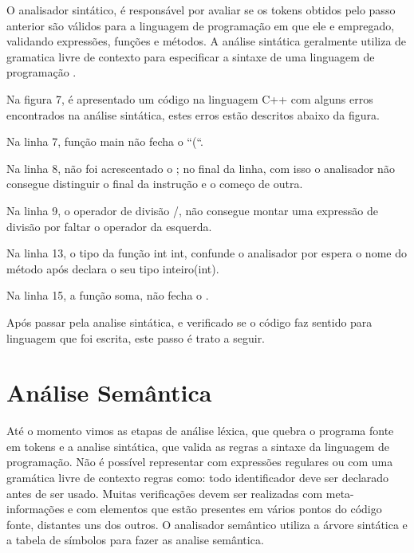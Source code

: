 \documentclass[12pt,oneside,a4paper,chapter=TITLE,section=TITLE,sumario=tradicional]{abntex2}
\begin{document}
O analisador sintático, é responsável por avaliar se os tokens obtidos pelo passo anterior são válidos para a linguagem de programação em que ele e empregado, validando expressões, funções e métodos. A análise sintática geralmente utiliza de gramatica livre de contexto para especificar a sintaxe de uma linguagem de programação \cite{maragon2015}.

Na figura 7, é apresentado um código na linguagem C++ com alguns erros encontrados na análise sintática, estes erros estão descritos abaixo da figura.

\begin{lista}
	\item Na linha 7, função main não fecha o “(“.
	\item Na linha 8, não foi acrescentado o ; no final da linha, com isso o analisador não consegue distinguir o final da instrução e o começo de outra.
	\item Na linha 9, o operador de divisão /, não consegue montar uma expressão de divisão por faltar o operador da esquerda. 
	\item Na linha 13, o tipo da função int int, confunde o analisador por espera o nome do método após declara o seu tipo inteiro(int).
	\item Na linha 15, a função soma, não fecha o .
\end{lista}

\begin{figure}[htb]
\end{figure}

Após passar pela analise sintática, e verificado se o código faz sentido para linguagem que foi escrita, este passo é trato a seguir.

\section{Análise Semântica}
\label{sec:analise-semantica}

Até o momento vimos as etapas de análise léxica, que quebra o programa fonte em tokens e a analise sintática, que valida as regras a sintaxe da linguagem de programação. Não é possível representar com expressões regulares ou com uma gramática livre de contexto regras como: todo identificador deve ser declarado antes de ser usado. Muitas verificações devem ser realizadas com meta-informações e com elementos que estão presentes em vários pontos do código fonte, distantes uns dos outros. O analisador semântico utiliza a árvore sintática e a tabela de símbolos para fazer as analise semântica. 
\end{document}
